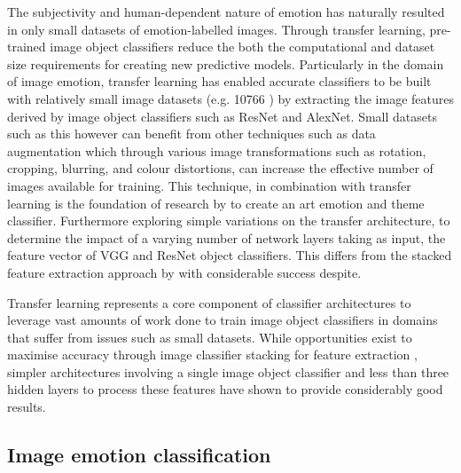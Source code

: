 \documentclass{article}
\begin{document}
The subjectivity and human-dependent nature of emotion has naturally resulted in only small datasets of emotion-labelled images.
Through transfer learning, pre-trained image object classifiers reduce the both the computational and dataset size requirements \citep{pan2009survey} for creating new predictive models.
Particularly in the domain of image emotion, transfer learning has enabled accurate classifiers to be built with relatively small image datasets (e.g. 10766 \citep{kim2018building}) by extracting the image features derived by image object classifiers such as ResNet and AlexNet.
Small datasets such as this however can benefit from other techniques such as data augmentation \citep{perez2017effectiveness} which through various image transformations such as rotation, cropping, blurring, and colour distortions, can increase the effective number of images available for training.
This technique, in combination with transfer learning is the foundation of research by \citet{wangarttalk} to create an art emotion and theme classifier.
Furthermore exploring simple variations on the transfer architecture, to determine the impact of a varying number of network layers taking as input, the feature vector of VGG and ResNet object classifiers.
This differs from the stacked feature extraction approach by \citet{kim2018building} with considerable success despite.

Transfer learning represents a core component of classifier architectures to leverage vast amounts of work done to train image object classifiers \citep{krizhevsky2012imagenet,pan2009survey} in domains that suffer from issues such as small datasets.
While opportunities exist to maximise accuracy through image classifier stacking for feature extraction \citep{kim2018building}, simpler architectures involving a single image object classifier and less than three hidden layers to process these features \citep{wangarttalk} have shown to provide considerably good results.


\subsection{Image emotion classification}
\end{document}
